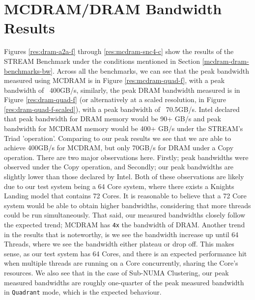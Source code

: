 \documentclass[bsc,frontabs,twoside,singlespacing,parskip,deptreport]{infthesis}     %
\begin{document}
\section{MCDRAM/DRAM Bandwidth Results}
Figures \ref{res:dram-a2a-f} through \ref{res:mcdram-snc4-c} show the results of the STREAM\cite{STREAM} Benchmark under the conditions mentioned in Section \ref{mcdram-dram-benchmarks-bw}. Across all the benchmarks, we can see that the peak bandwidth measured using MCDRAM is in Figure \ref{res:mcdram-quad-f}, with a peak bandwidth of ~400GB/s, similarly, the peak DRAM bandwidth measured is in Figure \ref{res:dram-quad-f} (or alternatively at a scaled resolution, in Figure \ref{res:dram-quad-f-scaled}), with a peak bandwidth of ~70.5GB/s. Intel declared\cite{intel_pres} that peak bandwidth for DRAM memory would be 90+ GB/s and peak bandwidth for MCDRAM memory would be 400+ GB/s under the STREAM's Triad 'operation'. Comparing to our peak results we see that we are able to achieve 400GB/s for MCDRAM, but only 70GB/s for DRAM under a Copy operation. There are two major observations here. Firstly; peak bandwidths were observed under the Copy operation, and Secondly; our peak bandwidths are slightly lower than those declared by Intel. Both of these observations are likely due to our test system being a 64 Core system, where there exists a Knights Landing model that contains 72 Cores. It is reasonable to believe that a 72 Core system would be able to obtain higher bandwidths, considering that more threads could be run simultaneously. That said, our measured bandwidths closely follow the expected trend; MCDRAM has \texttt{4x} the bandwidth of DRAM. Another trend in the results that is noteworthy, is we see the bandwidth increase up until 64 Threads, where we see the bandwidth either plateau or drop off. This makes sense, as our test system has 64 Cores, and there is an expected performance hit when multiple threads are running on a Core concurrently, sharing the Core's resources. We also see that in the case of Sub-NUMA Clustering, our peak measured bandwidths are roughly one-quarter of the peak measured bandwidth in \texttt{Quadrant} mode, which is the expected behaviour.
\end{document}

